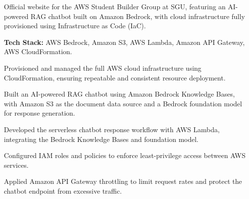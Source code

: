 \noindent Official website for the AWS Student Builder Group at SGU, featuring an AI-powered RAG chatbot built on Amazon Bedrock, with cloud infrastructure fully provisioned using Infrastructure as Code (IaC).\par

\noindent \textbf{Tech Stack:} AWS Bedrock, Amazon S3, AWS Lambda, Amazon API Gateway, AWS CloudFormation.\par

\vspace{-0.7em}

\begin{zitemize}

    \item Provisioned and managed the full AWS cloud infrastructure using CloudFormation, ensuring repeatable and consistent resource deployment.

    \item Built an AI-powered RAG chatbot using Amazon Bedrock Knowledge Bases, with Amazon S3 as the document data source and a Bedrock foundation model for response generation.

    \item Developed the serverless chatbot response workflow with AWS Lambda, integrating the Bedrock Knowledge Bases and foundation model.

    \item Configured IAM roles and policies to enforce least-privilege access between AWS services.

    \item Applied Amazon API Gateway throttling to limit request rates and protect the chatbot endpoint from excessive traffic.

\end{zitemize}



